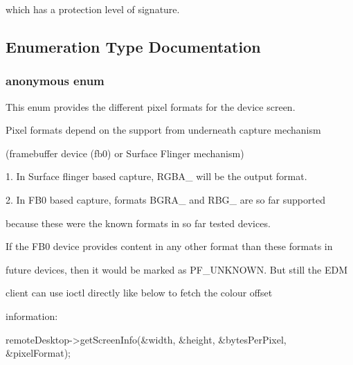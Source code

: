 which has a protection level of signature. 

\subsection{\-Enumeration \-Type \-Documentation}
\hypertarget{namespaceknoxremotedesktop_abb203e9b63692eb529da34e7e68158ec}{\subsubsection[{anonymous enum}]{\setlength{\rightskip}{0pt plus 5cm}anonymous enum}}\label{namespaceknoxremotedesktop_abb203e9b63692eb529da34e7e68158ec}


\-This enum provides the different pixel formats for the device screen. 

\-Pixel formats depend on the support from underneath capture mechanism

(framebuffer device (fb0) or \-Surface \-Flinger mechanism)\par
\par


1. \-In \-Surface flinger based capture, \-R\-G\-B\-A\-\_ will be the output format.\par
\par


2. \-In \-F\-B0 based capture, formats \-B\-G\-R\-A\-\_ and \-R\-B\-G\-\_ are so far supported

because these were the known formats in so far tested devices.

\-If the \-F\-B0 device provides content in any other format than these formats in

future devices, then it would be marked as \-P\-F\-\_\-\-U\-N\-K\-N\-O\-W\-N. \-But still the \-E\-D\-M

client can use ioctl directly like below to fetch the colour offset

information\-:\par



\begin{DoxyPre}\end{DoxyPre}



\begin{DoxyPre}	    remoteDesktop->getScreenInfo(&width, &height, &bytesPerPixel, &pixelFormat);\end{DoxyPre}




